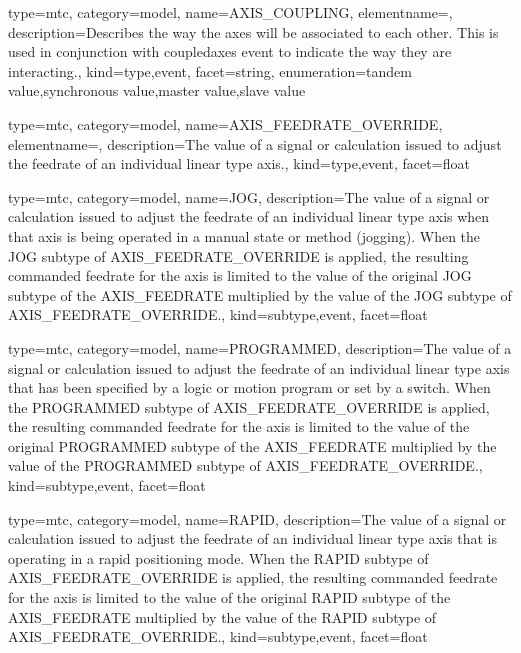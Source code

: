{
  type=mtc,
  category=model,
  name={AXIS\_COUPLING},
  elementname=,
  description={Describes the way the axes will be associated to each other. This is used in conjunction with \gls{coupledaxes event} to indicate the way they are interacting.},
  kind={type,event},
  facet={\gls{string}},
  enumeration={\gls{tandem value},\gls{synchronous value},\gls{master value},\gls{slave value}}
}


{
  type=mtc,
  category=model,
  name={AXIS\_FEEDRATE\_OVERRIDE},
  elementname=,
  description={The value of a signal or calculation issued to adjust the feedrate of an individual linear type axis.},
  kind={type,event},
  facet={\gls{float}}
}


{
  type=mtc,
  category=model,
  name={JOG},
  description={The value of a signal or calculation issued to adjust the feedrate of an individual linear type axis when that axis is being operated in a manual state or method (jogging).   \newline When the JOG subtype of AXIS\_FEEDRATE\_OVERRIDE is applied, the resulting commanded feedrate for the axis is limited to the value of the original JOG subtype of the AXIS\_FEEDRATE multiplied by the value of the JOG subtype of AXIS\_FEEDRATE\_OVERRIDE.},
  kind={subtype,event},
  facet={\gls{float}}
}


{
  type=mtc,
  category=model,
  name={PROGRAMMED},
  description={The value of a signal or calculation issued to adjust the feedrate of an individual linear type axis that has been specified by a logic or motion program or set by a switch. \newline When the PROGRAMMED subtype of AXIS\_FEEDRATE\_OVERRIDE is applied, the resulting commanded feedrate for the axis is limited to the value of the original PROGRAMMED subtype of the AXIS\_FEEDRATE multiplied by the value of the PROGRAMMED subtype of AXIS\_FEEDRATE\_OVERRIDE.},
  kind={subtype,event},
  facet={\gls{float}}
}


{
  type=mtc,
  category=model,
  name={RAPID},
  description={The value of a signal or calculation issued to adjust the feedrate of an individual linear type axis that is operating in a rapid positioning mode. \newline When the RAPID subtype of AXIS\_FEEDRATE\_OVERRIDE is applied, the resulting commanded feedrate for the axis is limited to the value of the original RAPID subtype of the AXIS\_FEEDRATE multiplied by the value of the RAPID subtype of AXIS\_FEEDRATE\_OVERRIDE.},
  kind={subtype,event},
  facet={\gls{float}}
}


